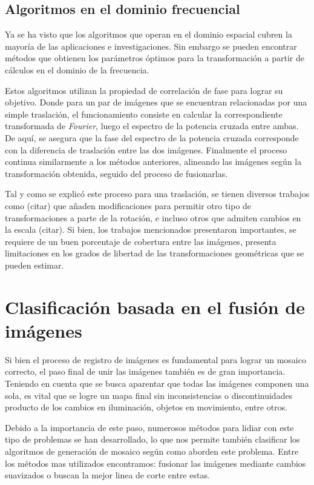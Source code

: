 \subsection*{Algoritmos en el dominio frecuencial}

Ya se ha visto que los algoritmos que operan en el dominio espacial cubren la mayoría de las aplicaciones e investigaciones. Sin embargo se pueden encontrar métodos que obtienen los parámetros óptimos para la transformación a partir de cálculos en el dominio de la frecuencia. 

Estos algoritmos utilizan la propiedad de correlación de fase para lograr su objetivo. Donde para un par de imágenes que se encuentran relacionadas por una simple traslación, el funcionamiento consiste en calcular la correspondiente transformada de \textit{Fourier}, luego el espectro de la potencia cruzada entre ambas. De aquí, se asegura que la fase del espectro de la potencia cruzada corresponde con la diferencia de traslación entre las dos imágenes. Finalmente el proceso continua similarmente a los métodos anteriores, alineando las imágenes según la transformación obtenida, seguido del proceso de fusionarlas.

Tal y como se explicó este proceso para una traslación, se tienen diversos trabajos como (citar) que añaden modificaciones para permitir otro tipo de transformaciones a parte de la rotación, e incluso otros que admiten cambios en la escala (citar). Si bien, los trabajos mencionados presentaron importantes, se requiere de un buen porcentaje de cobertura entre las imágenes, presenta limitaciones en los grados de libertad de las transformaciones geométricas que se pueden estimar.


\section*{Clasificación basada en el fusión de imágenes}

Si bien el proceso de registro de imágenes es fundamental para lograr un mosaico correcto, el paso final de unir las imágenes también es de gran importancia. Teniendo en cuenta que se busca aparentar que todas las imágenes componen una sola, es vital que se logre un mapa final sin inconsistencias o discontinuidades producto de los cambios en iluminación, objetos en movimiento, entre otros.

Debido a la importancia de este paso, numerosos métodos para lidiar con este tipo de problemas se han desarrollado, lo que nos permite también clasificar los algoritmos de generación de mosaico según como aborden este problema. Entre los métodos mas utilizados encontramos: fusionar las imágenes mediante cambios suavizados o buscan la mejor linea de corte entre estas.

